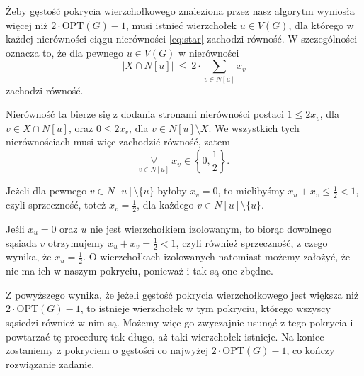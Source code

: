 \documentclass[12pt]{article}
\begin{document}
	\medskip
	
	Żeby gęstość pokrycia wierzchołkowego znaleziona przez nasz algorytm
	wyniosła więcej niż \(2 \cdot \text{OPT}(G) - 1\), musi istnieć wierzchołek
	\(u \in V(G)\), dla którego w każdej nierówności ciągu nierówności
	\ref{eq:star} zachodzi równość. W szczególności oznacza to, że dla pewnego
	\(u \in V(G)\) w nierówności
	\[ |X \cap N[u]| \ \leqslant \ 2 \cdot \sum\limits_{v \in N[u]} x_{v} \]
	zachodzi równość.
	
	\medskip
	
	Nierówność ta bierze się z dodania stronami nierówności postaci \(1
	\leqslant 2 x_{v}\), dla \(v \in X \cap N[u]\), oraz \(0 \leqslant 2x_{v}\),
	dla \(v \in N[u] \setminus X\). We wszystkich tych nierównościach musi więc zachodzić
	równość, zatem
	\[ \underset{v \in N[u]}{\forall} \ x_{v} \in \left\{ 0, \frac{1}{2}
	\right\} \text{.} \]
	
	\medskip
	
	Jeżeli dla pewnego \(v \in N[u] \setminus \{u\}\) byłoby \(x_{v} = 0\), to
	mielibyśmy \(x_{u} + x_{v} \leqslant \frac{1}{2} < 1\), czyli sprzeczność,
	toteż \(x_{v} = \frac{1}{2}\), dla każdego \(v \in N[u] \setminus \{u\}\).
	
	\medskip
	
	Jeśli \(x_{u} = 0\) oraz \(u\) nie jest wierzchołkiem izolowanym, to biorąc
	dowolnego sąsiada \(v\) otrzymujemy \(x_{u} + x_{v} = \frac{1}{2} < 1\),
	czyli również sprzeczność, z czego wynika, że \(x_{u} = \frac{1}{2}\). O
	wierzchołkach izolowanych natomiast możemy założyć, że nie ma ich w naszym
	pokryciu, ponieważ i tak są one zbędne.
	
	\medskip
	
	Z powyższego wynika, że jeżeli gęstość pokrycia wierzchołkowego jest większa
	niż \(2 \cdot \text{OPT}(G) - 1\), to istnieje wierzchołek w tym pokryciu,
	którego wszyscy sąsiedzi również w nim są. Możemy więc go zwyczajnie usunąć
	z tego pokrycia i powtarzać tę procedurę tak długo, aż taki wierzchołek
	istnieje. Na koniec zostaniemy z pokryciem o gęstości co najwyżej \(2 \cdot
	\text{OPT}(G) - 1\), co kończy rozwiązanie zadanie.
\end{document}
